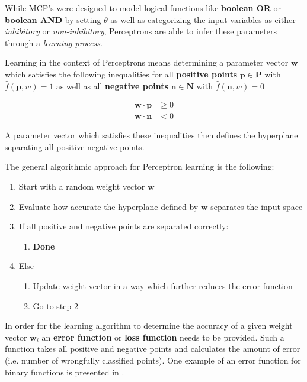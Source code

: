While MCP's were designed to model logical functions like \textbf{boolean OR} or \textbf{boolean AND} by setting $\theta$ as well as categorizing the input variables as either \textit{inhibitory} or \textit{non-inhibitory}, Perceptrons are able to infer these parameters through a \textit{learning process}.

Learning in the context of Perceptrons means determining a parameter vector $\bm{w}$ which satisfies the following inequalities for all \textbf{positive points} $\bm{p} \in \bm{P}$ with $\hat{f}(\bm{p}, w) = 1$ as well as all \textbf{negative points} $\bm{n} \in \bm{N}$ with $\hat{f}(\bm{n}, w) = 0$

\begin{equation}
    \begin{split}
        \bm{w} \cdot \bm{p} &\geq 0 \\
        \bm{w} \cdot \bm{n} &< 0
    \end{split}
\end{equation}

A parameter vector which satisfies these inequalities then defines the hyperplane separating all positive negative points.

The general algorithmic approach for Perceptron learning is the following:
\begin{enumerate}
    \item Start with a random weight vector $\bm{w}$
    \item Evaluate how accurate the hyperplane defined by $\bm{w}$ separates the input space
    \item If all positive and negative points are separated correctly:
    \begin{enumerate}
        \item \textbf{Done}
    \end{enumerate}
    \item Else
    \begin{enumerate}
        \item Update weight vector in a way which further reduces the error function
        \item Go to step 2
    \end{enumerate}
\end{enumerate}

In order for the learning algorithm to determine the accuracy of a given weight vector $\bm{w}_i$ an \textbf{error function} or \textbf{loss function} needs to be provided.
Such a function takes all positive and negative points and calculates the amount of error (i.e. number of wrongfully classified points).
One example of an error function for binary functions is presented in \cite{rojas_neural_1996}.

